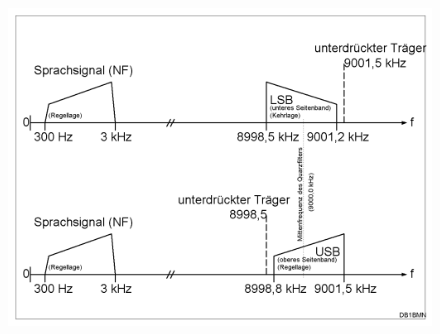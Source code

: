 \begin{frame}
  \begin{center}
    \begin{figure}
      \includegraphics[width=1\textwidth,height=.9\textheight,keepaspectratio]{e16/Ssb-de.png}
    \end{figure}
  \end{center}
\end{frame}

